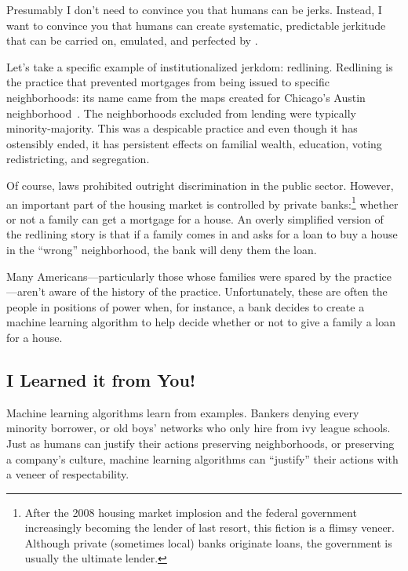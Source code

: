 
Presumably I don't need to convince you that humans can be jerks.
Instead, I want to convince you that humans can create systematic,
predictable jerkitude that can be carried on, emulated, and perfected
by .

Let's take a specific example of institutionalized jerkdom: redlining.
Redlining is the practice that prevented mortgages from being issued
to specific neighborhoods: its name came from the maps created for
Chicago's Austin neighborhood~\citep{pogge-92}.
The neighborhoods excluded from lending were typically minority-majority.
This was a despicable practice and even though it has ostensibly
ended, it has persistent effects on familial wealth, education, voting
redistricting, and segregation.

Of course, laws prohibited outright discrimination in the public
sector.  However, an important part of the housing market is
controlled by private banks:\footnote{After the 2008 housing market
  implosion and the federal government increasingly becoming the
  lender of last resort, this fiction is a flimsy veneer.  Although
  private (sometimes local) banks originate loans, the government is
  usually the ultimate lender.} whether or not a family can get a
mortgage for a house.  An overly simplified version of the redlining
story is that if a family comes in and asks for a loan to buy a house
in the ``wrong'' neighborhood, the bank will deny them the loan.

Many Americans---particularly those whose families were spared by the
practice---aren't aware of the history of the practice.
Unfortunately, these are often the people in positions of power when,
for instance, a bank decides to create a machine learning algorithm to
help decide whether or not to give a family a loan for a house.

\subsection{I Learned it from You!}

Machine learning algorithms learn from examples.  Bankers denying every minority
borrower, or old boys' networks who only hire from ivy league
schools.  Just as humans can justify their actions preserving neighborhoods, or
preserving a company's culture, machine learning algorithms can
``justify'' their actions with a veneer of respectability.

